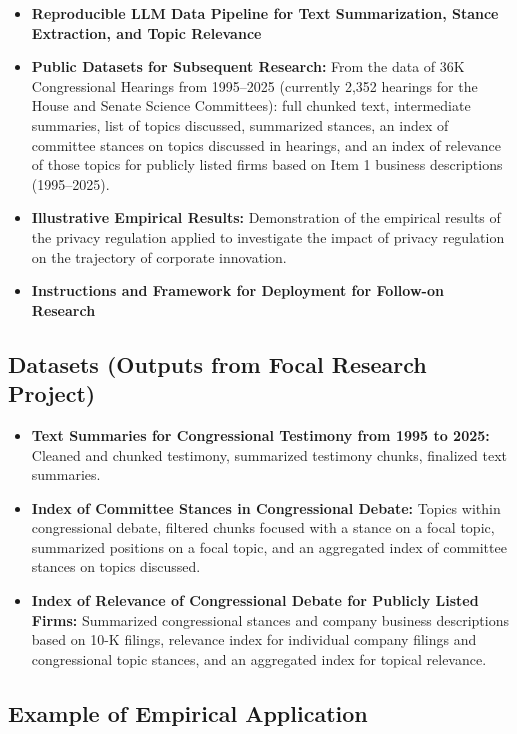\documentclass[11pt]{article}
\begin{document}
\begin{itemize}
    \item \textbf{Reproducible LLM Data Pipeline for Text Summarization, Stance Extraction, and Topic Relevance}
    \item \textbf{Public Datasets for Subsequent Research:} From the data of 36K Congressional Hearings from 1995--2025 (currently 2,352 hearings for the House and Senate Science Committees): full chunked text, intermediate summaries, list of topics discussed, summarized stances, an index of committee stances on topics discussed in hearings, and an index of relevance of those topics for publicly listed firms based on Item 1 business descriptions (1995--2025).
    \item \textbf{Illustrative Empirical Results:} Demonstration of the empirical results of the privacy regulation applied to investigate the impact of privacy regulation on the trajectory of corporate innovation.
    \item \textbf{Instructions and Framework for Deployment for Follow-on Research}
\end{itemize}

\subsection{Datasets (Outputs from Focal Research Project)}

\begin{itemize}
    \item \textbf{Text Summaries for Congressional Testimony from 1995 to 2025:} Cleaned and chunked testimony, summarized testimony chunks, finalized text summaries.
    \item \textbf{Index of Committee Stances in Congressional Debate:} Topics within congressional debate, filtered chunks focused with a stance on a focal topic, summarized positions on a focal topic, and an aggregated index of committee stances on topics discussed.
    \item \textbf{Index of Relevance of Congressional Debate for Publicly Listed Firms:} Summarized congressional stances and company business descriptions based on 10-K filings, relevance index for individual company filings and congressional topic stances, and an aggregated index for topical relevance.
\end{itemize}

\subsection{Example of Empirical Application}
\end{document}
